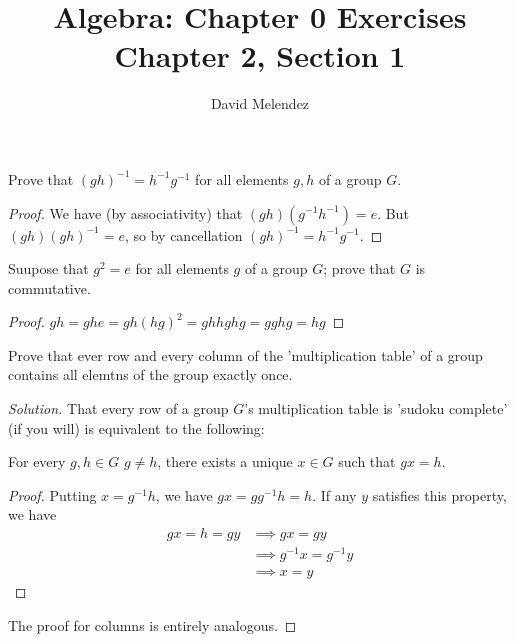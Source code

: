 \documentclass[12pt]{article}
\newenvironment{problem}[2][Problem]{\begin{trivlist}
\item[\hskip \labelsep {\bfseries #1}\hskip \labelsep {\bfseries #2.}]}{\end{trivlist}}
\newenvironment{proposition}[1][Proposition]{\begin{trivlist}
\item[\hskip \labelsep {\bfseries #1.}]}{\end{trivlist}}
\newenvironment{solution}
  {\renewcommand\qedsymbol{$\blacksquare$}\begin{proof}[Solution]}
{\end{proof}}
\newenvironment{sproof}{
  \renewcommand\qedsymbol{$\square$}
  \begin{proof}
  }{
  \end{proof}
}
\begin{document}
\title{Algebra: Chapter 0 Exercises\\ \large Chapter 2, Section 1}
\author{David Melendez}
\maketitle

\begin{problem}{1.3}
  Prove that $(gh)^{-1} = h^{-1}g^{-1}$ for all elements $g,h$ of a group $G$.
\end{problem}
\begin{proof}
  We have (by associativity) that $(gh)(g^{-1}h^{-1}) = e$. But $(gh)(gh)^{-1} = e$, so by cancellation 
  $(gh)^{-1}=h^{-1}g^{-1}$.
\end{proof}

\begin{problem}{1.4}
  Suupose that $g^2=e$ for all elements $g$ of a group $G$; prove that $G$ is commutative.
\end{problem}
\begin{proof}
  $gh = ghe = gh(hg)^2 = ghhghg = gghg = hg$
\end{proof}

\begin{problem}{1.5}
  Prove that ever row and every column of the 'multiplication table' of a group contains all elemtns of the group exactly once.
\end{problem}
\begin{solution}
  That every row of a group $G$'s multiplication table is 'sudoku complete' (if you will) is equivalent to the following:\\
  \begin{proposition}
    For every $g, h \in G$ $g\neq h$, there exists a unique $x \in G$ such that $gx=h$.
  \end{proposition}
  \begin{sproof}
    Putting $x=g^{-1}h$, we have $gx = gg^{-1}h = h$. 
    If any $y$ satisfies this property, we have 
    \begin{align*}
    gx = h = gy &\implies gx = gy\\
    &\implies g^{-1}x = g^{-1}y\\
    &\implies x = y
    \end{align*}
  \end{sproof}
  The proof for columns is entirely analogous.
\end{solution}

\newpage
\end{document}
